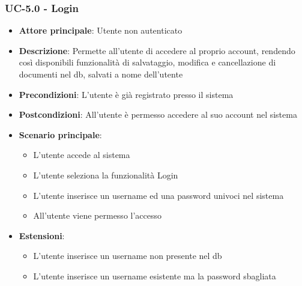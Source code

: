 \documentclass[11pt,a4paper]{article}
\begin{document}
\subsubsection{UC-5.0 - Login}
\begin{itemize}
    \item \textbf{Attore principale}: Utente non autenticato
    \item \textbf{Descrizione}: Permette all'utente di accedere al proprio account, rendendo così disponibili funzionalità di salvataggio, modifica e cancellazione di documenti nel db, salvati a nome dell'utente
    \item \textbf{Precondizioni}: L'utente è già registrato presso il sistema
    \item \textbf{Postcondizioni}: All'utente è permesso accedere al suo account nel sistema
    \item \textbf{Scenario principale}:
        \begin{itemize}
            \item L'utente accede al sistema
            \item L'utente seleziona la funzionalità Login
            \item L'utente inserisce un username ed una password univoci nel sistema
            \item All'utente viene permesso l'accesso
        \end{itemize}
    \item \textbf{Estensioni}:
        \begin{itemize}
            \item L'utente inserisce un username non presente nel db
            \item L'utente inserisce un username esistente ma la password sbagliata
        \end{itemize}
\end{itemize}
\end{document}
